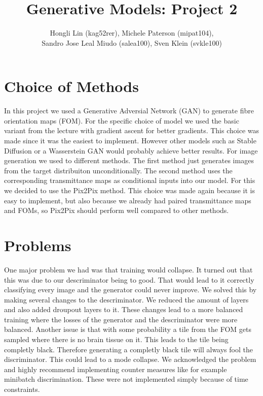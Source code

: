 \documentclass[12pt]{article}
\begin{document}
 
%
%
 
\title{Generative Models: Project 2} %
\author{Hongli Lin (kag52rer), Michele Paterson (mipat104),\\ Sandro Jose Leal Miudo (salea100), Sven Klein (svkle100)} %
\maketitle
\section{Choice of Methods}
In this project we used a Generative Adversial Network (GAN) to generate fibre orientation maps (FOM). For the specific choice of model we used the basic variant from the lecture with gradient ascent for better gradients. This choice was made since it was the easiest to implement. However other models such as Stable Diffusion or a Wasserstein GAN would probably achieve better results. For image generation we used to different methods. The first method just generates images from the target distribuiton unconditionally. The second method uses the corresponding transmittance maps as conditional inputs into our model. For this we decided to use the Pix2Pix method. This choice was made again because it is easy to implement, but also because we already had paired transmittance maps and FOMs, so Pix2Pix should perform well compared to other methods. 
\section{Problems}
One major problem we had was that training would collapse. It turned out that this was due to our descriminator being to good. That would lead to it correctly classifying every image and the generator could never improve. We solved this by making several changes to the descriminator. We reduced the amount of layers and also added droupout layers to it. These changes lead to a more balanced training where the losses of the generator and the descriminator were more balanced.
Another issue is that with some probability a tile from the FOM gets sampled where there is no brain tissue on it. This leads to the tile being completly black. Therefore generating a completly black tile will always fool the discriminator. This could lead to a mode collapse. We acknowledged the problem and highly recommend implementing counter measures like for example minibatch discrimination. These were not implemented simply because of time constraints.
\end{document}
